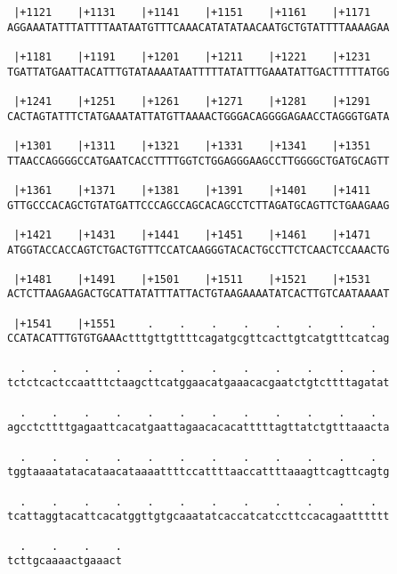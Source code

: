 \documentclass{article}
\begin{document}
\begin{Verbatim}
 |+1121    |+1131    |+1141    |+1151    |+1161    |+1171   
AGGAAATATTTATTTTAATAATGTTTCAAACATATATAACAATGCTGTATTTTAAAAGAA
                                                            
 |+1181    |+1191    |+1201    |+1211    |+1221    |+1231   
TGATTATGAATTACATTTGTATAAAATAATTTTTATATTTGAAATATTGACTTTTTATGG
                                                            
 |+1241    |+1251    |+1261    |+1271    |+1281    |+1291   
CACTAGTATTTCTATGAAATATTATGTTAAAACTGGGACAGGGGAGAACCTAGGGTGATA
                                                            
 |+1301    |+1311    |+1321    |+1331    |+1341    |+1351   
TTAACCAGGGGCCATGAATCACCTTTTGGTCTGGAGGGAAGCCTTGGGGCTGATGCAGTT
                                                            
 |+1361    |+1371    |+1381    |+1391    |+1401    |+1411   
GTTGCCCACAGCTGTATGATTCCCAGCCAGCACAGCCTCTTAGATGCAGTTCTGAAGAAG
                                                            
 |+1421    |+1431    |+1441    |+1451    |+1461    |+1471   
ATGGTACCACCAGTCTGACTGTTTCCATCAAGGGTACACTGCCTTCTCAACTCCAAACTG
                                                            
 |+1481    |+1491    |+1501    |+1511    |+1521    |+1531   
ACTCTTAAGAAGACTGCATTATATTTATTACTGTAAGAAAATATCACTTGTCAATAAAAT
                                                            
 |+1541    |+1551     .    .    .    .    .    .    .    .  
CCATACATTTGTGTGAAActttgttgttttcagatgcgttcacttgtcatgtttcatcag
                                                            
  .    .    .    .    .    .    .    .    .    .    .    .  
tctctcactccaatttctaagcttcatggaacatgaaacacgaatctgtcttttagatat
                                                            
  .    .    .    .    .    .    .    .    .    .    .    .  
agcctcttttgagaattcacatgaattagaacacacatttttagttatctgtttaaacta
                                                            
  .    .    .    .    .    .    .    .    .    .    .    .  
tggtaaaatatacataacataaaattttccattttaaccattttaaagttcagttcagtg
                                                            
  .    .    .    .    .    .    .    .    .    .    .    .  
tcattaggtacattcacatggttgtgcaaatatcaccatcatccttccacagaatttttt
                                                            
  .    .    .    .
tcttgcaaaactgaaact
                  
                  
\end{Verbatim}
\end{document}
